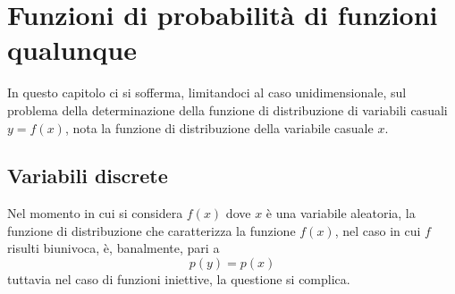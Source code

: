 \documentclass{report}
\begin{document}
\chapter{Funzioni di probabilità di funzioni qualunque}

In questo capitolo ci si sofferma, limitandoci al caso unidimensionale, sul problema della determinazione della funzione di distribuzione di variabili casuali $y = f(x)$, nota la funzione di distribuzione della variabile casuale $x$.
\section{Variabili discrete}
Nel momento in cui si considera $f(x)$ dove $x$ è una variabile aleatoria, la funzione di distribuzione che caratterizza la funzione $f(x)$, nel caso in cui $f$ risulti biunivoca, è, banalmente, pari a
$$
	p(y)=p(x)
$$
tuttavia nel caso di funzioni iniettive, la questione si complica.
\pagebreak
\printindex
\end{document}
